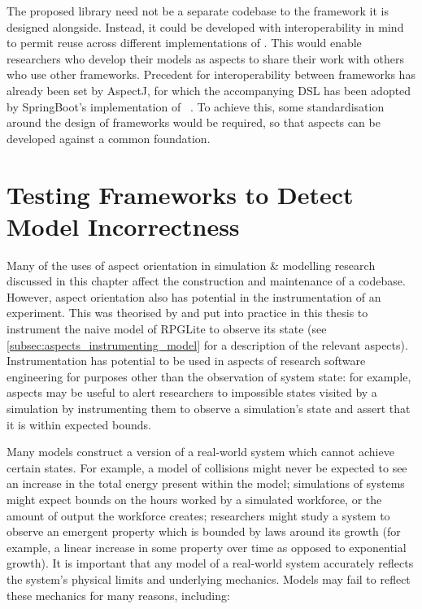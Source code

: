 The proposed library need not be a separate codebase to the \aspectorientation{}
framework it is designed alongside. Instead, it could be developed with
interoperability in mind to permit reuse across different implementations of
\aop{}. This would enable researchers who develop their models as aspects to
share their work with others who use other frameworks. Precedent for
interoperability between frameworks has already been set by AspectJ, for which
the accompanying DSL has been adopted by SpringBoot's implementation of
\aop{}~\cite{introducing_spring_aop_chapter_integration_with_aspectj}. To
achieve this, some standardisation around the design of \aspectorientation{}
frameworks would be required, so that aspects can be developed against a common
foundation.





\section{Testing Frameworks to Detect Model Incorrectness}
\label{sciunits_for_unrealistic_states}

Many of the uses of aspect orientation in simulation \& modelling research
discussed in this chapter affect the construction and maintenance of a codebase.
However, aspect orientation also has potential in the instrumentation of an
experiment. This was theorised by \citet{gulyas1999use} and put into practice in
this thesis to instrument the naive model of RPGLite to observe its state (see
\cref{subsec:aspects_instrumenting_model} for a description of the relevant
aspects). Instrumentation has potential to be used in aspects of research
software engineering for purposes other than the observation of system state:
for example, aspects may be useful to alert researchers to impossible states
visited by a simulation by instrumenting them to observe a simulation's state
and assert that it is within expected bounds.

Many models construct a version of a real-world system which cannot achieve
certain states. For example, a model of collisions might never be expected to
see an increase in the total energy present within the model;
simulations of \sociotechnical systems might expect bounds on the hours worked
by a simulated workforce, or the amount of output the workforce creates;
researchers might study a system to observe an emergent property which is
bounded by laws around its growth (for example, a linear increase in some
property over time as opposed to exponential growth). It is important that any
model of a real-world system accurately reflects the system's physical limits
and underlying mechanics. Models may fail to reflect these mechanics for many
reasons, including:

